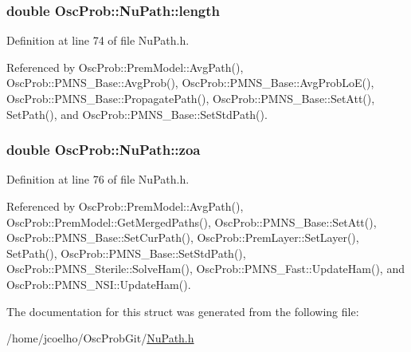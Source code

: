 \subsubsection[{\texorpdfstring{length}{length}}]{\setlength{\rightskip}{0pt plus 5cm}double Osc\+Prob\+::\+Nu\+Path\+::length}\hypertarget{structOscProb_1_1NuPath_af22660894b6e25cf835500381b155557}{}\label{structOscProb_1_1NuPath_af22660894b6e25cf835500381b155557}


Definition at line 74 of file Nu\+Path.\+h.



Referenced by Osc\+Prob\+::\+Prem\+Model\+::\+Avg\+Path(), Osc\+Prob\+::\+P\+M\+N\+S\+\_\+\+Base\+::\+Avg\+Prob(), Osc\+Prob\+::\+P\+M\+N\+S\+\_\+\+Base\+::\+Avg\+Prob\+Lo\+E(), Osc\+Prob\+::\+P\+M\+N\+S\+\_\+\+Base\+::\+Propagate\+Path(), Osc\+Prob\+::\+P\+M\+N\+S\+\_\+\+Base\+::\+Set\+Att(), Set\+Path(), and Osc\+Prob\+::\+P\+M\+N\+S\+\_\+\+Base\+::\+Set\+Std\+Path().

\subsubsection[{\texorpdfstring{zoa}{zoa}}]{\setlength{\rightskip}{0pt plus 5cm}double Osc\+Prob\+::\+Nu\+Path\+::zoa}\hypertarget{structOscProb_1_1NuPath_af3213f3691ba83c6bc05f4a3490f6b31}{}\label{structOscProb_1_1NuPath_af3213f3691ba83c6bc05f4a3490f6b31}


Definition at line 76 of file Nu\+Path.\+h.



Referenced by Osc\+Prob\+::\+Prem\+Model\+::\+Avg\+Path(), Osc\+Prob\+::\+Prem\+Model\+::\+Get\+Merged\+Paths(), Osc\+Prob\+::\+P\+M\+N\+S\+\_\+\+Base\+::\+Set\+Att(), Osc\+Prob\+::\+P\+M\+N\+S\+\_\+\+Base\+::\+Set\+Cur\+Path(), Osc\+Prob\+::\+Prem\+Layer\+::\+Set\+Layer(), Set\+Path(), Osc\+Prob\+::\+P\+M\+N\+S\+\_\+\+Base\+::\+Set\+Std\+Path(), Osc\+Prob\+::\+P\+M\+N\+S\+\_\+\+Sterile\+::\+Solve\+Ham(), Osc\+Prob\+::\+P\+M\+N\+S\+\_\+\+Fast\+::\+Update\+Ham(), and Osc\+Prob\+::\+P\+M\+N\+S\+\_\+\+N\+S\+I\+::\+Update\+Ham().



The documentation for this struct was generated from the following file\+:\begin{DoxyCompactItemize}
\item 
/home/jcoelho/\+Osc\+Prob\+Git/\hyperlink{NuPath_8h}{Nu\+Path.\+h}\end{DoxyCompactItemize}
